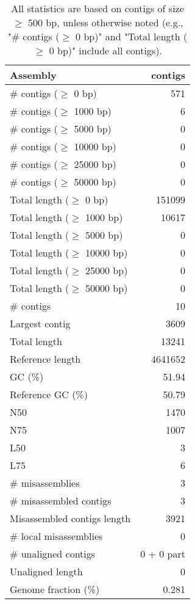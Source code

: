 \documentclass[12pt,a4paper]{article}
\begin{document}
\begin{table}[ht]
\begin{center}
\caption{All statistics are based on contigs of size $\geq$ 500 bp, unless otherwise noted (e.g., "\# contigs ($\geq$ 0 bp)" and "Total length ($\geq$ 0 bp)" include all contigs).}
\begin{tabular}{|l*{1}{|r}|}
\hline
Assembly & contigs \\ \hline
\# contigs ($\geq$ 0 bp) & 571 \\ \hline
\# contigs ($\geq$ 1000 bp) & 6 \\ \hline
\# contigs ($\geq$ 5000 bp) & 0 \\ \hline
\# contigs ($\geq$ 10000 bp) & 0 \\ \hline
\# contigs ($\geq$ 25000 bp) & 0 \\ \hline
\# contigs ($\geq$ 50000 bp) & 0 \\ \hline
Total length ($\geq$ 0 bp) & 151099 \\ \hline
Total length ($\geq$ 1000 bp) & 10617 \\ \hline
Total length ($\geq$ 5000 bp) & 0 \\ \hline
Total length ($\geq$ 10000 bp) & 0 \\ \hline
Total length ($\geq$ 25000 bp) & 0 \\ \hline
Total length ($\geq$ 50000 bp) & 0 \\ \hline
\# contigs & 10 \\ \hline
Largest contig & 3609 \\ \hline
Total length & 13241 \\ \hline
Reference length & 4641652 \\ \hline
GC (\%) & 51.94 \\ \hline
Reference GC (\%) & 50.79 \\ \hline
N50 & 1470 \\ \hline
N75 & 1007 \\ \hline
L50 & 3 \\ \hline
L75 & 6 \\ \hline
\# misassemblies & 3 \\ \hline
\# misassembled contigs & 3 \\ \hline
Misassembled contigs length & 3921 \\ \hline
\# local misassemblies & 0 \\ \hline
\# unaligned contigs & 0 + 0 part \\ \hline
Unaligned length & 0 \\ \hline
Genome fraction (\%) & 0.281 \\ \hline

\end{tabular}
\end{center}
\end{table}
\end{document}
